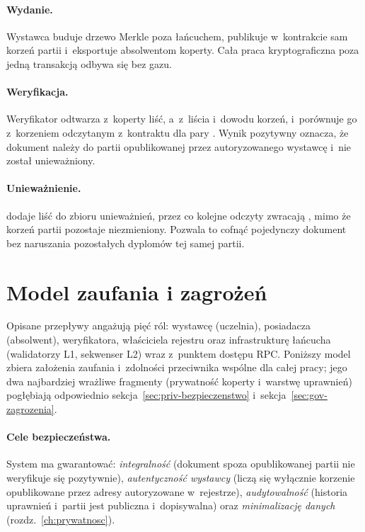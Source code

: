 \paragraph{Wydanie.} Wystawca buduje drzewo Merkle poza łańcuchem, publikuje
w~kontrakcie sam korzeń partii i~eksportuje absolwentom koperty. Cała praca
kryptograficzna poza jedną transakcją odbywa się bez gazu.

\paragraph{Weryfikacja.} Weryfikator odtwarza z~koperty liść, a~z~liścia i~dowodu
korzeń, i~porównuje go z~korzeniem odczytanym z~kontraktu dla pary
. Wynik pozytywny oznacza, że dokument należy do partii
opublikowanej przez autoryzowanego wystawcę i~nie został unieważniony.

\paragraph{Unieważnienie.}  dodaje liść do zbioru
unieważnień, przez co kolejne odczyty zwracają , mimo że korzeń
partii pozostaje niezmieniony. Pozwala to cofnąć pojedynczy dokument bez
naruszania pozostałych dyplomów tej samej partii.

\section{Model zaufania i zagrożeń}
\label{sec:model-zagrozen}

Opisane przepływy angażują pięć ról: wystawcę (uczelnia), posiadacza (absolwent),
weryfikatora, właściciela rejestru oraz infrastrukturę łańcucha (walidatorzy L1,
sekwenser L2) wraz z~punktem dostępu RPC. Poniższy model zbiera założenia
zaufania i~zdolności przeciwnika wspólne dla całej pracy; jego dwa najbardziej
wrażliwe fragmenty (prywatność koperty i~warstwę uprawnień) pogłębiają
odpowiednio sekcja~\ref{sec:priv-bezpieczenstwo}
i~sekcja~\ref{sec:gov-zagrozenia}.

\paragraph{Cele bezpieczeństwa.} System ma gwarantować: \emph{integralność}
(dokument spoza opublikowanej partii nie weryfikuje się pozytywnie),
\emph{autentyczność wystawcy} (liczą się wyłącznie korzenie opublikowane przez
adresy autoryzowane w~rejestrze), \emph{audytowalność} (historia uprawnień
i~partii jest publiczna i~dopisywalna) oraz \emph{minimalizację danych}
(rozdz.~\ref{ch:prywatnosc}).

